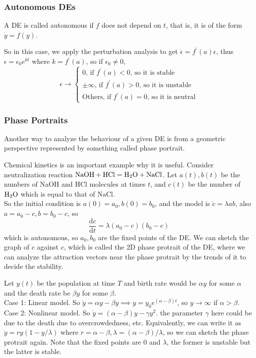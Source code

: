 \subsubsection{Autonomous DEs}
\begin{definition}
    A DE is called autonomous if $f$ does not depend on $t$, that is, it is of the form $\dot{y}=f(y)$.
\end{definition}
So in this case, we apply the perturbation analysis to get $\dot{\epsilon}=f^\prime(a)\epsilon$, thus $\epsilon=\epsilon_0e^{kt}$ where $k=f^\prime(a)$, so if $\epsilon_0\neq 0$,
$$\epsilon\to
\begin{cases}
    0\text{, if $f^\prime(a)<0$, so it is stable}\\
    \pm\infty\text{, if $f^\prime(a)>0$, so it is unstable}\\
    \text{Others, if $f^\prime(a)=0$, so it is neutral}
\end{cases}$$
\subsubsection{Phase Portraits}
Another way to analyze the behaviour of a given DE is from a geometric perspective represented by something called phase portrait.
\begin{example}
    Chemical kinetics is an important example why it is useful.
    Consider neutralization reaction ${\rm NaOH+HCl=H_2O+NaCl}$.
    Let $a(t),b(t)$ be the numbers of NaOH and HCl molecules at times $t$, and $c(t)$ be the number of ${\rm H_2O}$ which is equal to that of NaCl.\\
    So the initial condition is $a(0)=a_0,b(0)=b_0$, and the model is $\dot{c}=\lambda ab$, also $a=a_0-c,b=b_0-c$, so
    $$\frac{\mathrm dc}{\mathrm dt}=\lambda(a_0-c)(b_0-c)$$
    which is autonomous, so $a_0,b_0$ are the fixed points of the DE.
    We can sketch the graph of $\dot{c}$ against $c$, which is called the 2D phase protrait of the DE, where we can analyze the attraction vectors near the phase protrait by the trends of it to decide the stability.
\end{example}
\begin{example}\label{logistic_cont}
    Let $y(t)$ be the population at time $T$ and birth rate would be $\alpha y$ for some $\alpha$ and the death rate be $\beta y$ for some $\beta$.\\
    Case 1: Linear model.
    So $\dot{y}=\alpha y-\beta y\implies y=y_0e^{(\alpha -\beta)t}$, so $y\to\infty$ if $\alpha>\beta$.\\
    Case 2: Nonlinear model.
    So $\dot{y}=(\alpha-\beta)y-\gamma y^2$.
    the parameter $\gamma$ here could be due to the death due to overcrowdedness, etc.
    Equivalently, we can write it as $\dot{y}=ry(1-y/\lambda)$ where $r=\alpha-\beta,\lambda=(\alpha-\beta)/\lambda$, so we can sketch the phase protrait again.
    Note that the fixed points are $0$ and $\lambda$, the former is unstable but the latter is stable.
\end{example}

